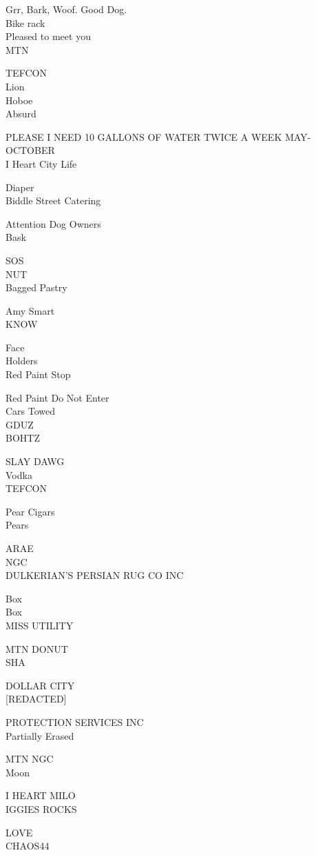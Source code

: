 \documentclass[10pt,letterpaper]{article}
\begin{document}
Grr, Bark, Woof.  Good Dog.\\
Bike rack\\
Pleased to meet you\\
MTN

TEFCON\\
Lion\\
Hoboe\\
Absurd

PLEASE I NEED 10 GALLONS OF WATER TWICE A WEEK MAY{-}OCTOBER\\
I Heart City Life

Diaper\\
Biddle Street Catering

Attention Dog Owners\\
Bask

SOS\\
NUT\\
Bagged Pastry

Amy Smart\\
KNOW

Face\\
Holders\\
Red Paint Stop

Red Paint Do Not Enter\\
Cars Towed\\
GDUZ\\
BOHTZ

SLAY DAWG\\
Vodka\\
TEFCON

Pear Cigars\\
Pears

ARAE\\
NGC\\
DULKERIAN'S PERSIAN RUG CO INC

Box\\
Box\\
MISS UTILITY

MTN DONUT\\
SHA

DOLLAR CITY\\
{[}REDACTED{]}

PROTECTION SERVICES INC\\
Partially Erased

MTN NGC\\
Moon

I HEART MILO\\
IGGIES ROCKS

LOVE\\
CHAOS44
\end{document}
